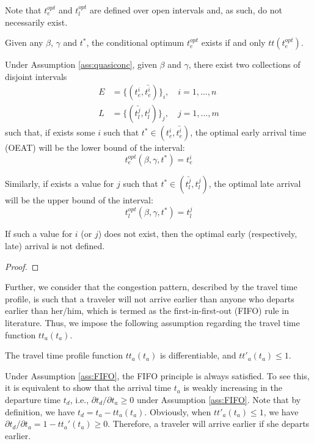 Note that $t_e^{opt}$ and $t_l^{opt}$ are defined over open intervals and, as such, do not necessarily exist. 
\begin{lemma}
Given any $\beta$, $\gamma$ and $t^*$, the conditional optimum $t_e^{opt}$ exists if and only $tt(t_e^{opt})$. 
\end{lemma}
\begin{prop}
  \label{prop:into-early-late}
Under Assumption \ref{ass:quasiconc}, given  \(\beta\) and \( \gamma\),
  there exist two collections of disjoint intervals
  \begin{align*}
    E & = \{(t_e^i, \bar{t_e^i})\}_i,\quad i = 1, \dots, n \\
    L & = \{(\bar{t_l^j}, t_l^j)\}_j,\quad j = 1, \dots, m 
  \end{align*}
  such that, if exists some \(i\) such that \(t^* \in (t_e^i, \bar{t_e^i})\),
  the optimal early arrival time (OEAT) will be the lower bound of the interval:
  \begin{equation*}
    t_e^{opt}(\beta, \gamma, t^*) = t_e^{i}
  \end{equation*}

  Similarly, if exists a value for \(j\) such that \(t^* \in (\bar{t_l^j}, t_l^j)\),
  the optimal late arrival will be the upper bound of the interval:
  \begin{equation*}
    t_l^{opt}(\beta, \gamma, t^*) = t_l^{j}
  \end{equation*}

  If such a value for \(i\) (or \(j\)) does not exist,
  then the optimal early (respectively, late) arrival is not defined.
\end{prop}
\begin{proof}

\end{proof}

Further, we consider that the congestion pattern, described by the travel time profile, is such that a traveler will not arrive earlier than anyone who departs earlier than her/him, which is termed as the first-in-first-out (FIFO) rule in literature. Thus, we impose the following assumption regarding the travel time function  $tt_a(t_a)$.



\begin{assumption}\label{ass:FIFO}
The travel time profile function $tt_a(t_a)$ is differentiable, and $tt'_a(t_a) \le 1$. 
\end{assumption}


Under Assumption \ref{ass:FIFO}, the FIFO principle is always satisfied. To see this, it is equivalent to show that the arrival time $t_a$ is weakly increasing in the departure time $t_d$, i.e., $\partial t_d / \partial t_a \ge 0$ under Assumption \ref{ass:FIFO}.  Note that by definition, we have $ t_d = t_a - tt_a(t_a)  $.  Obviously, when $tt'_a(t_a) \le 1$, we have $\partial t_d / \partial t_a = 1 - tt_a'(t_a) \ge 0$. Therefore, a traveler will arrive earlier if she departs earlier. 



